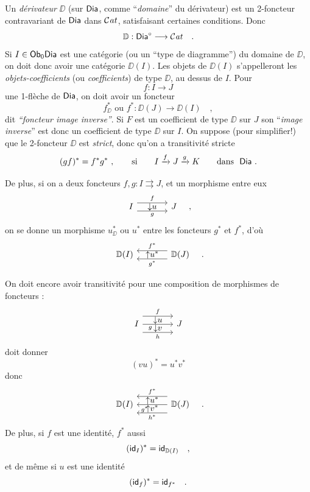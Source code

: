 Un \textit{dérivateur} $\DD$ (sur $\mathsf{Dia}$, comme “\textit{domaine}” du dérivateur) est un 2-foncteur contravariant de $\mathsf{Dia}$ dans $\mathcal{C}\mathit{at}$, satisfaisant certaines conditions. Donc
\[ \mathbb{D} : \mathsf{Dia}^{\circ} \longrightarrow \mathcal{C}\mathit{at} \quad . \]
Si $I \in \mathsf{Ob}_0 \mathsf{Dia}$ est une catégorie (ou un “type de diagramme”) du domaine de $\DD$, on doit donc avoir une catégorie $\DD(I)$. Les objets de $\DD(I)$ s'appelleront les \textit{objets-coefficients} (ou \textit{coefficients}) de type $\DD$, au dessus de $I$. Pour
\[ f : I \longrightarrow J \]
une 1-flèche de $\mathsf{Dia}$, on doit avoir un foncteur
\[ f^*_{\DD} \text{ ou } f^* : \DD(J) \longrightarrow \DD(I) \quad , \]
dit \textit{“foncteur image inverse”}. Si $F$ est un coefficient de type $\DD$ sur $J$ son “\textit{image inverse}” est donc un coefficient de type $\DD$ sur $I$. On suppose (pour simplifier!) que le 2-foncteur $\DD$ est \textit{strict}, donc qu'on a transitivité stricte
\[ (gf)^* = f^*g^* \ , \qquad \text{si} \qquad I \xrightarrow{f} J \xrightarrow{g} K \qquad \text{dans} \ \ \Dia \ . \]


De plus, si on a deux foncteurs $f, g : I \rightrightarrows J$, et un morphisme entre eux
\[
\begin{tikzcd}[column sep=large]
I \arrow[r, shift left=2, "f"] \arrow[r, shift right=2, "g"'] \arrow[r, phantom, "{\downarrow}u"] & J
\end{tikzcd}
\quad ,
\]
on se donne un morphisme $u^*_{\DD}$ ou $u^*$ entre les foncteurs $g^*$ et $f^*$, d'où
\[
\begin{tikzcd}[column sep=large]
\DD(I) & \DD(J) \arrow[l, shift right=2, "f^*"'] \arrow[l, shift left=2, "g^*"] \arrow[l, phantom, "{\uparrow}u^*"]
\end{tikzcd}
\quad .
\]


On doit encore avoir transitivité pour une composition de morphismes de foncteurs :
\[
\begin{tikzcd}[column sep=large]
I \arrow[r, shift left=4, "f"] \arrow[r, "g"' near start] \arrow[r, shift right=4, "h"'] \arrow[r, phantom, shift left=2, "{\downarrow}u"] \arrow[r, phantom, shift right=2, "{\downarrow}v"] & J
\end{tikzcd}
\]
doit donner
\[ (vu)^* = u^*v^* \]
donc
\[
\begin{tikzcd}[column sep=large]
\DD(I) & \DD(J) \arrow[l, shift right=4, "f^*"'] \arrow[l, "g^*" near end] \arrow[l, shift left=4, "h^*"] \arrow[l, phantom, shift right=2, "{\uparrow}u^*"] \arrow[l, phantom, shift left=2, "{\uparrow}v^*"]
\end{tikzcd}
\quad .
\]
De plus, si $f$ est une identité, $f^*$ aussi
\[ (\mathsf{id}_I)^* = \mathsf{id}_{\mathbb{D}(I)} \quad , \]
et de même si $u$ est une identité
\[ (\mathsf{id}_f)^* = \mathsf{id}_{f^*} \quad . \]

